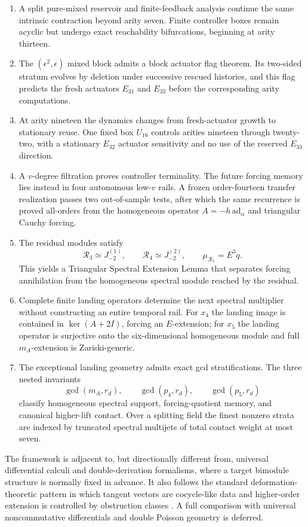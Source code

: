\documentclass[11pt]{amsart}
\begin{document}
\begin{enumerate}[label=(\roman*)]
\item A split pure-mixed reservoir and finite-feedback analysis continue the same intrinsic contraction beyond arity seven.  Finite controller boxes remain acyclic but undergo exact reachability bifurcations, beginning at arity thirteen.
\item The $(\epsilon^2,\epsilon)$ mixed block admits a block actuator flag theorem.  Its two-sided stratum evolves by deletion under successive rescued histories, and this flag predicts the fresh actuators $E_{31}$ and $E_{32}$ before the corresponding arity computations.
\item At arity nineteen the dynamics changes from fresh-actuator growth to stationary reuse.  One fixed box $U_{16}$ controls arities nineteen through twenty-two, with a stationary $E_{32}$ actuator sensitivity and no use of the reserved $E_{33}$ direction.
\item A $v$-degree filtration proves controller terminality.  The future forcing memory lies instead in four autonomous low-$v$ rails.  A frozen order-fourteen transfer realization passes two out-of-sample tests, after which the same recurrence is proved all-orders from the homogeneous operator $A=-h\,\mathrm{ad}_\alpha$ and triangular Cauchy forcing.
\item The residual modules satisfy
\[
\mathcal R_3\simeq J_{-2}^{(1)},
\qquad
\mathcal R_4\simeq J_{-2}^{(2)},
\qquad
\mu_{\mathcal R_5}=E^3q.
\]
This yields a Triangular Spectral Extension Lemma that separates forcing annihilation from the homogeneous spectral module reached by the residual.
\item Complete finite landing operators determine the next spectral multiplier without constructing an entire temporal rail.  For $x_4$ the landing image is contained in $\ker(A+2I)$, forcing an $E$-extension; for $x_5$ the landing operator is surjective onto the six-dimensional homogeneous module and full $m_A$-extension is Zariski-generic.
\item The exceptional landing geometry admits exact gcd stratifications.  The three nested invariants
\[
\gcd(m_A,r_d),\qquad \gcd(p_4,r_d),\qquad \gcd(p_5,r_d)
\]
classify homogeneous spectral support, forcing-quotient memory, and canonical higher-lift contact.  Over a splitting field the finest nonzero strata are indexed by truncated spectral multijets of total contact weight at most seven.
\end{enumerate}

The framework is adjacent to, but directionally different from, universal differential calculi and double-derivation formalisms, where a target bimodule structure is normally fixed in advance.  It also follows the standard deformation-theoretic pattern in which tangent vectors are cocycle-like data and higher-order extension is controlled by obstruction classes \cite{Gerstenhaber1964,Schlessinger1968}.  A full comparison with universal noncommutative differentials and double Poisson geometry \cite{CuntzQuillen1995,VanDenBergh2008} is deferred.
\end{document}
